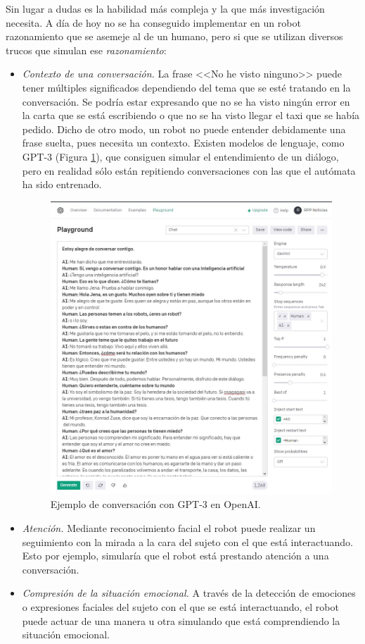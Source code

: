 Sin lugar a dudas es la habilidad más compleja y la que más investigación necesita. A día de hoy no se ha conseguido implementar en un robot razonamiento que se asemeje al de un humano, pero si que se utilizan diversos trucos que simulan ese \textit{razonamiento}:

\begin{itemize}
\item \textit{Contexto de una conversación.} La frase <<No he visto ninguno>> puede tener múltiples significados dependiendo del tema que se esté tratando en la conversación. Se podría estar expresando que no se ha visto ningún error en la carta que se está escribiendo o que no se ha visto llegar el taxi que se había pedido. Dicho de otro modo, un robot no puede entender debidamente una frase suelta, pues necesita un contexto. Existen modelos de lenguaje, como GPT-3 (Figura \ref{fig:gpt3}), que consiguen simular el entendimiento de un diálogo, pero en realidad sólo están repitiendo conversaciones con las que el autómata ha sido entrenado.

\begin{figure} [h!]
  \begin{center}
    \includegraphics[width=12cm]{figs/gpt3.jpg}
  \end{center}
  \caption{Ejemplo de conversación con GPT-3 en OpenAI.}
  \label{fig:gpt3}
\end{figure}

\item \textit{Atención.} Mediante reconocimiento facial el robot puede realizar un seguimiento con la mirada a la cara del sujeto con el que está interactuando. Esto por ejemplo, simularía que el robot está prestando atención a una conversación.

\item \textit{Compresión de la situación emocional.} A través de la detección de emociones o expresiones faciales del sujeto con el que se está interactuando, el robot puede actuar de una manera u otra simulando que está comprendiendo la situación emocional.

\end{itemize}

